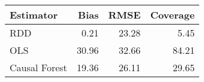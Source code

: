\begin{table}[ht]
\centering
\begin{tabular}{lrrr}
  \hline
Estimator & Bias & RMSE & Coverage \\ 
  \hline
RDD & 0.21 & 23.28 & 5.45 \\ 
  OLS & 30.96 & 32.66 & 84.21 \\ 
  Causal Forest & 19.36 & 26.11 & 29.65 \\ 
   \hline
\end{tabular}
\end{table}
